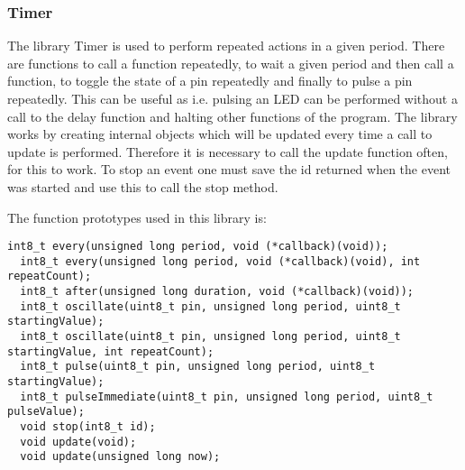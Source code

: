 \subsubsection{Timer}
The library Timer is used to perform repeated actions in a given period.
There are functions to call a function repeatedly, to wait a given period and then call a function, to toggle the state of a pin repeatedly and finally to pulse a pin repeatedly. 
This can be useful as i.e. pulsing an LED can be performed without a call to the delay function and halting other functions of the program.
The library works by creating internal objects which will be updated every time a call to update is performed. 
Therefore it is necessary to call the update function often, for this to work. 
To stop an event one must save the id returned when the event was started and use this to call the stop method. 

The function prototypes used in this library is:
\begin{lstlisting}[style=customc]
  int8_t every(unsigned long period, void (*callback)(void));
  int8_t every(unsigned long period, void (*callback)(void), int repeatCount);
  int8_t after(unsigned long duration, void (*callback)(void));
  int8_t oscillate(uint8_t pin, unsigned long period, uint8_t startingValue);
  int8_t oscillate(uint8_t pin, unsigned long period, uint8_t startingValue, int repeatCount);
  int8_t pulse(uint8_t pin, unsigned long period, uint8_t startingValue);
  int8_t pulseImmediate(uint8_t pin, unsigned long period, uint8_t pulseValue);
  void stop(int8_t id);
  void update(void);
  void update(unsigned long now);
\end{lstlisting}
